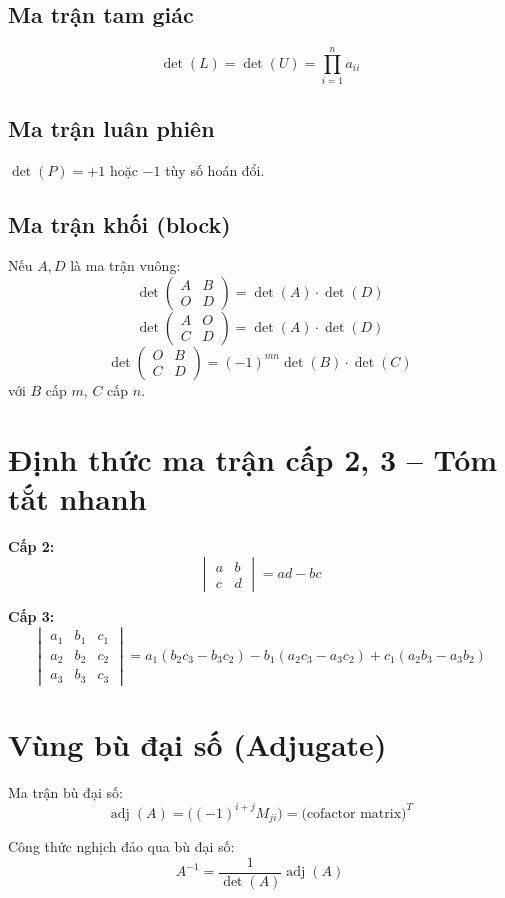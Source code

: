 \subsection{Ma trận tam giác}
\[
\det(L) = \det(U) = \prod_{i=1}^n a_{ii}
\]

\subsection{Ma trận luân phiên}
$\det(P) = +1$ hoặc $-1$ tùy số hoán đổi.

\subsection{Ma trận khối (block)}
Nếu $A, D$ là ma trận vuông:
\[
\det\begin{pmatrix} A & B \\ O & D \end{pmatrix} = \det(A) \cdot \det(D)
\]
\[
\det\begin{pmatrix} A & O \\ C & D \end{pmatrix} = \det(A) \cdot \det(D)
\]
\[
\det\begin{pmatrix} O & B \\ C & D \end{pmatrix} = (-1)^{mn} \det(B) \cdot \det(C)
\]
với $B$ cấp $m$, $C$ cấp $n$.

\section{Định thức ma trận cấp 2, 3 -- Tóm tắt nhanh}

\textbf{Cấp 2:}
\[
\begin{vmatrix} a & b \\ c & d \end{vmatrix} = ad - bc
\]

\textbf{Cấp 3:}
\[
\begin{vmatrix}
a_1 & b_1 & c_1 \\
a_2 & b_2 & c_2 \\
a_3 & b_3 & c_3
\end{vmatrix}
= a_1(b_2c_3 - b_3c_2) - b_1(a_2c_3 - a_3c_2) + c_1(a_2b_3 - a_3b_2)
\]

\section{Vùng bù đại số (Adjugate)}

Ma trận bù đại số:
\[
\operatorname{adj}(A) = \bigl((-1)^{i+j} M_{ji}\bigr) = \bigl(\text{cofactor matrix}\bigr)^T
\]

Công thức nghịch đảo qua bù đại số:
\[
A^{-1} = \frac{1}{\det(A)} \operatorname{adj}(A)
\]

